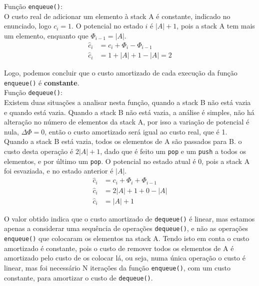 \documentclass[a4paper,11pt]{article}
\begin{document}
	\noindent Função \texttt{enqueue()}:\\
	
	\noindent O custo real de adicionar um elemento à stack A é constante, indicado no enunciado, logo $c_i = 1$. O potencial no estado $i$ é $|A|+1$, pois a stack A tem mais um elemento, enquanto que $\Phi_{i-1} = |A|$.
	\begin{align*}
		\hat{c}_i & = c_i + \Phi_i - \Phi_{i-1} \\
		\hat{c}_i & = 1 + |A| + 1 - |A| = 2
	\end{align*}
	
	\noindent Logo, podemos concluir que o custo amortizado de cada execução da função \texttt{enqueue()} é \textbf{constante}.\\
	
	\noindent Função \texttt{dequeue()}:\\
	
	\noindent Existem duas situações a analisar nesta função, quando a stack B não está vazia e quando está vazia. Quando a stack B não está vazia, a análise é simples, não há alteração no número de elementos da stack A, por isso a variação de potencial é nula, $\Delta \Phi = 0$, então o custo amortizado será igual ao custo real, que é 1.\\
	
	\noindent Quando a stack B está vazia, todos os elementos de A são passados para B. o custo desta operação é $ 2 |A| + 1 $, dado que é feito um \texttt{pop} e um \texttt{push} a todos os elementos, e por último um \texttt{pop}. O potencial no estado atual é 0, pois a stack A foi esvaziada, e no estado anterior é $|A|$.
	\begin{align*}
		\hat{c}_i & = c_i + \Phi_i + \Phi_{i-1} \\
		\hat{c}_i & = 2 |A| + 1 + 0 - |A| \\
		\hat{c}_i & = |A| + 1
	\end{align*}
		
	\noindent O valor obtido indica que o custo amortizado de \texttt{dequeue()} é linear, mas estamos apenas a considerar uma sequência de operações \texttt{dequeue()}, e não as operações \texttt{enqueue()} que colocaram os elementos na stack A. Tendo isto em conta o custo amortizado é constante, pois o custo de remover todos os elementos de A é amortizado pelo custo de os colocar lá, ou seja, numa única operação o custo é linear, mas foi necessário N iterações da função \texttt{enqueue()}, com um custo constante, para amortizar o custo de \texttt{dequeue()}.\\
\end{document}
